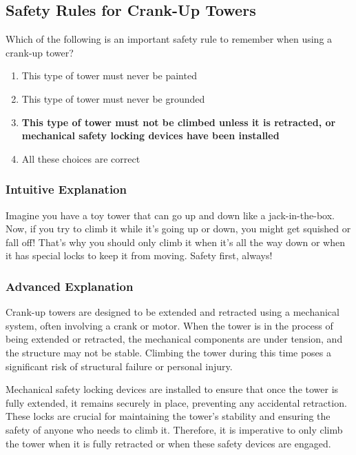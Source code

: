 \subsection{Safety Rules for Crank-Up Towers}
\label{T0B07}

\begin{tcolorbox}[colback=gray!10!white,colframe=black!75!black,title=T0B07]
Which of the following is an important safety rule to remember when using a crank-up tower?
\begin{enumerate}[label=\Alph*]
    \item This type of tower must never be painted
    \item This type of tower must never be grounded
    \item \textbf{This type of tower must not be climbed unless it is retracted, or mechanical safety locking devices have been installed}
    \item All these choices are correct
\end{enumerate}
\end{tcolorbox}

\subsubsection{Intuitive Explanation}
Imagine you have a toy tower that can go up and down like a jack-in-the-box. Now, if you try to climb it while it's going up or down, you might get squished or fall off! That’s why you should only climb it when it’s all the way down or when it has special locks to keep it from moving. Safety first, always!

\subsubsection{Advanced Explanation}
Crank-up towers are designed to be extended and retracted using a mechanical system, often involving a crank or motor. When the tower is in the process of being extended or retracted, the mechanical components are under tension, and the structure may not be stable. Climbing the tower during this time poses a significant risk of structural failure or personal injury. 

Mechanical safety locking devices are installed to ensure that once the tower is fully extended, it remains securely in place, preventing any accidental retraction. These locks are crucial for maintaining the tower's stability and ensuring the safety of anyone who needs to climb it. Therefore, it is imperative to only climb the tower when it is fully retracted or when these safety devices are engaged.

